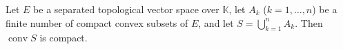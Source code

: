 Let $E$ be a separated topological vector space over $\mathbb{K}$, let $A_k$ ($k = 1, \ldots, n$) be a finite number of compact convex subsets of $E$, and let $S = \bigcup_{k=1}^n A_k$. Then $\operatorname{conv} S$ is compact.
